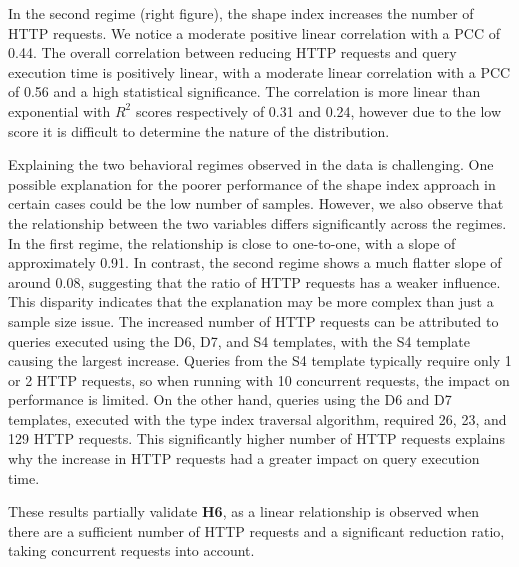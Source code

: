 In the second regime (right figure), the shape index increases the number of HTTP requests.
We notice a moderate positive linear correlation with a PCC of 0.44.
The overall correlation between reducing HTTP requests and query execution time is positively linear, with a moderate linear correlation with a PCC of 0.56 and a high statistical significance.
The correlation is more linear than exponential with $R^2$ scores respectively of 0.31 and 0.24, however due to the low score it is difficult to determine the nature of the distribution.

Explaining the two behavioral regimes observed in the data is challenging.
One possible explanation for the poorer performance of the shape index approach in certain cases could be the low number of samples.
However, we also observe that the relationship between the two variables differs significantly across the regimes.
In the first regime, the relationship is close to one-to-one, with a slope of approximately 0.91.
In contrast, the second regime shows a much flatter slope of around 0.08, suggesting that the ratio of HTTP requests has a weaker influence.
This disparity indicates that the explanation may be more complex than just a sample size issue.
The increased number of HTTP requests can be attributed to queries executed using the D6, D7, and S4 templates, with the S4 template causing the largest increase.
Queries from the S4 template typically require only 1 or 2 HTTP requests, so when running with 10 concurrent requests, the impact on performance is limited.
On the other hand, queries using the D6 and D7 templates, executed with the type index traversal algorithm, required 26, 23, and 129 HTTP requests.
This significantly higher number of HTTP requests explains why the increase in HTTP requests had a greater impact on query execution time.

These results partially validate \textbf{H6}, as a linear relationship is observed when there are a sufficient number of HTTP requests and a significant reduction ratio, taking concurrent requests into account.
